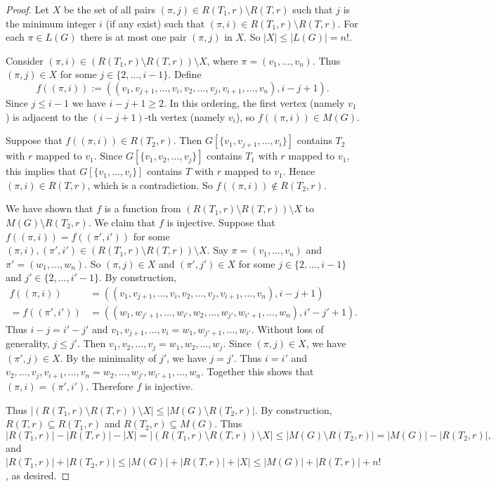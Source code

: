 \documentclass[a4paper,11pt]{article}
\renewcommand{\geq}{\geqslant}
\renewcommand{\leq}{\leqslant}
\begin{document}
\begin{proof}
Let $X$ be the set of all pairs $(\pi,j)\in R(T_1,r) \setminus R(T,r)$ such that $j$ is the minimum integer $i$ (if any exist) such that  $(\pi,i)\in R(T_1,r) \setminus R(T,r)$. 
For each $\pi\in L(G)$ there is at most one pair $(\pi,j)$ in $X$. 
So $|X|\leq |L(G)|=n!$. 

Consider $(\pi,i) \in ( R(T_1,r) \setminus R(T,r) ) \setminus X$, where $\pi=(v_1,\dots,v_n)$. 
Thus $(\pi,j)\in X$ for some $j\in\{2,\dots,i-1\}$. 
Define
\[f((\pi,i)) := (( v_1,v_{j+1},\dots,v_i, v_2,\dots,v_j, v_{i+1},\dots,v_n),i-j+1).\] 
Since $j\leq i-1$ we have $i-j+1\geq 2$. 
In this ordering, the first vertex (namely $v_1$) is adjacent to the $(i-j+1)$-th vertex (namely $v_i$), so $f((\pi,i)) \in M(G)$. 

Suppose that $f((\pi,i))\in R(T_2,r)$. 
Then $G[\{v_1,v_{j+1},\dots,v_i\}]$ contains $T_2$ with $r$ mapped to $v_1$. 
Since $G[\{v_1,v_2,\dots,v_j\}]$ contains $T_1$ with $r$ mapped to $v_1$,  
this implies that $G[\{v_1,\dots,v_i\}]$ contains $T$ with $r$ mapped to $v_1$. 
Hence  $(\pi,i)\in R(T,r)$, which is a contradiction. 
So $f((\pi,i)) \not\in R(T_2,r)$. 

We have shown that  $f$ is a function from $( R(T_1,r) \setminus R(T,r) ) \setminus X$ to $M(G) \setminus R(T_2,r)$. 
We claim that $f$ is injective. 
Suppose that $f((\pi,i))=f((\pi',i'))$ for some $(\pi,i),(\pi',i')\in (R(T_1,r) \setminus R(T,r) ) \setminus X$. 
Say $\pi=(v_1,\dots,v_n)$ and $\pi'=(w_1,\dots,w_n)$. 
So $(\pi,j) \in X$ and $ (\pi',j') \in X$ for some $j\in\{2,\dots,i-1\}$ and $j'\in\{2,\dots,i'-1\}$. 
By construction,
\begin{align*}
f((\pi,i)) & = (( v_1,v_{j+1},\dots,v_i, v_2,\dots,v_j,v_{i+1},\dots,v_n),i-j+1)\\
= f((\pi',i')) & = (( w_1,w_{j'+1},\dots,w_{i'}, w_2,\dots,w_{j'}, w_{i'+1},\dots,w_n),i'-j'+1).
\end{align*}
Thus $i-j=i'-j'$ and 
$v_1,v_{j+1},\dots,v_i=w_1,w_{j'+1},\dots,w_{i'}$.
Without loss of generality, $j \leq j'$. 
Then $v_1,v_2,\dots,v_j=w_1,w_2,\dots,w_{j}$. 
Since $(\pi,j)\in X$, we have $(\pi',j)\in X$. 
By the minimality of $j'$, we have $j=j'$. 
Thus $i=i'$ and $v_2,\dots,v_j,v_{i+1},\dots,v_n=w_2,\dots,w_{j'}, w_{i'+1},\dots,w_n$. 
Together this shows that $(\pi,i)=(\pi',i')$. 
Therefore $f$ is injective. 

Thus $|( R(T_1,r) \setminus R(T,r) ) \setminus X | \leq |M(G) \setminus R(T_2,r)|$. 
By construction, $R(T,r) \subseteq R(T_1,r)$ and $R(T_2,r) \subseteq M(G)$. 
Thus
\[ | R(T_1,r)|  - | R(T,r) |  - |X | = 
|( R(T_1,r) \setminus R(T,r) ) \setminus X | \leq |M(G) \setminus R(T_2,r)| = |M(G)| - | R(T_2,r)| ,\] 
and 
$|R(T_1,r)| +  | R(T_2,r)|  \leq |M(G)| + | R(T,r) |+ |X | \leq |M(G)| +|R(T,r)| + n!$, as desired. 
\end{proof}
\end{document}

